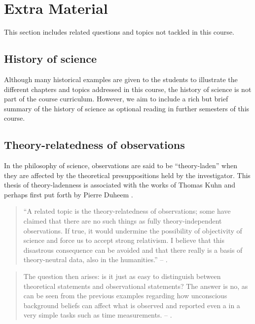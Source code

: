 \documentclass[
]{book}
\begin{document}
\hypertarget{wont-fix}{%
\chapter{Extra Material}\label{wont-fix}}

This section includes related questions and topics not tackled in this course.

\hypertarget{history-of-science}{%
\section{History of science}\label{history-of-science}}

Although many historical examples are given to the students to illustrate the different chapters and topics addressed in this course, the history of science is not part of the course curriculum. However, we aim to include a rich but brief summary of the history of science as optional reading in further semesters of this course.

\hypertarget{theory-relatedness-of-observations}{%
\section{Theory-relatedness of observations}\label{theory-relatedness-of-observations}}

In the philosophy of science, observations are said to be ``theory-laden'' when they are affected by the theoretical presuppositions held by the investigator. This thesis of theory-ladenness is associated with the works of Thomas Kuhn and perhaps first put forth by Pierre Duheem \citep{sep-science-theory-observation}.

\begin{quote}
``A related topic is the theory-relatedness of observations; some have claimed that there are no such things as fully theory-independent observations. If true, it would undermine the possibility of objectivity of science and force us to accept strong relativism. I believe that this disastrous consequence can be avoided and that there really is a basis of theory-neutral data, also in the humanities.'' -- \citep{johansson2016philosophy}.
\end{quote}

\begin{quote}
The question then arises: is it just as easy to distinguish between theoretical statements and observational statements? The answer is no, as can be seen from the previous examples regarding how unconscious background beliefs can affect what is observed and reported even a in a very simple tasks such as time measurements. -- \citep{johansson2016philosophy}.
\end{quote}
\end{document}
